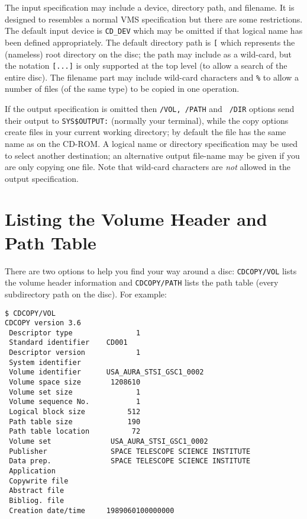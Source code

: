 The input specification may include a device, directory path, and
filename. It is designed to resembles a normal VMS specification but
there are some restrictions. The default input device is {\tt CD\_DEV}
which may be omitted if that logical name has been defined appropriately.
The default directory path is {\tt [}\hspace{1mm}{\tt ]} which
represents the (nameless) root directory on the disc; the path may
include {\tt *} as a wild-card, but the notation {\tt [...]} is only
supported at the top level (to allow a search of the entire disc). The
filename part may include wild-card characters {\tt *} and {\tt \%} to
allow a number of files (of the same type) to be copied in one
operation. 

If the output specification is omitted then {\tt /VOL, /PATH} and {\tt
/DIR} options send their output to \verb+SYS$OUTPUT:+ (normally your
terminal), while the copy options create files in your current working
directory; by default the file has the same name as on the CD-ROM. A
logical name or directory specification may be used to select another
destination; an alternative output file-name may be given if you are
only copying one file. Note that wild-card characters are {\em not}
allowed in the output specification. 

\section{Listing the Volume Header and Path Table} 

There are two options to help you find your way around a disc:
{\tt CDCOPY/VOL} lists the volume header information and {\tt CDCOPY/PATH} 
lists the path table (every subdirectory path on the disc). For example:
\goodbreak
\begin{verbatim}
$ CDCOPY/VOL 
CDCOPY version 3.6
 Descriptor type               1
 Standard identifier    CD001
 Descriptor version            1
 System identifier                                      
 Volume identifier      USA_AURA_STSI_GSC1_0002         
 Volume space size       1208610
 Volume set size               1
 Volume sequence No.           1
 Logical block size          512
 Path table size             190
 Path table location          72
 Volume set              USA_AURA_STSI_GSC1_0002
 Publisher               SPACE TELESCOPE SCIENCE INSTITUTE
 Data prep.              SPACE TELESCOPE SCIENCE INSTITUTE
 Application              
 Copywrite file                                              
 Abstract file                                               
 Bibliog. file                                               
 Creation date/time     1989060100000000
\end{verbatim}

